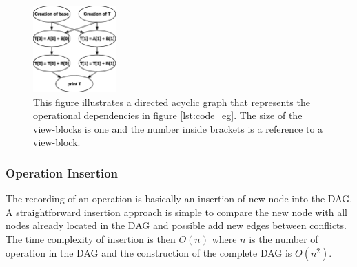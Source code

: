 \documentclass[preprint]{../PGAS10/sigplanconf}
\begin{document}
\begin{figure}
 \centering
 \includegraphics[width=120px]{gfx/dag}
 \caption{This figure illustrates a directed acyclic graph that represents the operational dependencies in figure \ref{lst:code_eg}. The size of the view-blocks is one and the number inside brackets is a reference to a view-block.}
 \label{fig:DAG}
\end{figure}


\subsubsection{Operation Insertion}
The recording of an operation is basically an insertion of new node into the DAG. A straightforward insertion approach is simple to compare the new node with all nodes already located in the DAG and possible add new edges between conflicts. The time complexity of insertion is then $O(n)$ where $n$ is the number of operation in the DAG and the construction of the complete DAG is $O(n^2)$.

\end{document}
